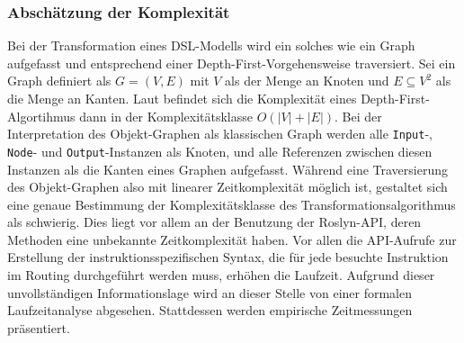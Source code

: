 \subsubsection{Abschätzung der Komplexität}
\label{subsubsec:Abschaetzung der Komplexitaet}
Bei der Transformation eines DSL-Modells wird ein solches wie ein Graph aufgefasst und entsprechend einer Depth-First-Vorgehensweise traversiert. Sei ein Graph definiert als $G = (V, E)$ mit $V$ als der Menge an Knoten und $E \subseteq V^{2}$ als die Menge an Kanten. Laut \cite[S. 479]{Cormen:90} befindet sich die Komplexität eines Depth-First-Algortihmus dann in der Komplexitätsklasse $O(\left\vert{V}\right\vert + \left\vert{E}\right\vert)$. Bei der Interpretation des Objekt-Graphen als klassischen Graph werden alle \texttt{Input}-, \texttt{Node}- und \texttt{Output}-Instanzen als Knoten, und alle Referenzen zwischen diesen Instanzen als die Kanten eines Graphen aufgefasst. Während eine Traversierung des Objekt-Graphen also mit linearer Zeitkomplexität möglich ist, gestaltet sich eine genaue Bestimmung der Komplexitätsklasse des Transformationsalgorithmus als schwierig. Dies liegt vor allem an der Benutzung der Roslyn-API, deren Methoden eine unbekannte Zeitkomplexität haben. Vor allen die API-Aufrufe zur Erstellung der instruktionsspezifischen Syntax, die für jede besuchte Instruktion im Routing durchgeführt werden muss, erhöhen die Laufzeit.
\newline
Aufgrund dieser unvollständigen Informationslage wird an dieser Stelle von einer formalen Laufzeitanalyse abgesehen. Stattdessen werden empirische Zeitmessungen präsentiert.

